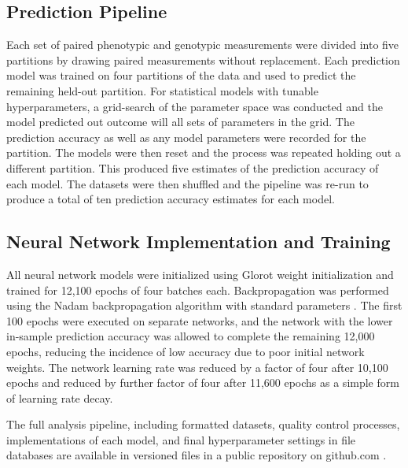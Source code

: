 \subsection*{Prediction Pipeline}


Each set of paired phenotypic and genotypic measurements were divided into 
five partitions by drawing paired measurements without replacement. Each prediction model
was trained on four partitions of the data and used to predict the remaining held-out partition. 
For statistical models with tunable hyperparameters, a grid-search of the parameter 
space was conducted and the model predicted out outcome will all sets of parameters in the grid.
The prediction accuracy as well as any model parameters were recorded for the partition. The models 
were then reset and the process was repeated holding out a different partition. This produced 
five estimates of the prediction accuracy of each model. The datasets were then shuffled 
and the pipeline was re-run to produce a total of ten prediction accuracy estimates for each model. 

\subsection{Neural Network Implementation and Training}

All neural network models were initialized using Glorot weight initialization \citep{glorot2010} 
and trained for 12,100 epochs of four batches each. Backpropagation was performed using the 
Nadam backpropagation algorithm with standard parameters \citep{dozat2015}. 
The first 100 epochs were executed on separate networks, and the network with the lower 
in-sample prediction accuracy was allowed to complete the remaining 12,000 epochs, 
reducing the incidence of low accuracy due to poor initial network weights.
The network learning rate was reduced by a factor of four after 10,100 epochs and reduced by further
factor of four after 11,600 epochs as a simple form of learning rate decay.

The full analysis pipeline, including formatted datasets, quality control processes, 
implementations of each model, and final hyperparameter settings in file databases 
are available in versioned files in a public repository on github.com \citep{mcdowell2016}.

